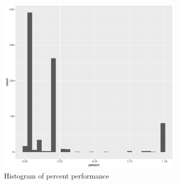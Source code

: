 \documentclass{article}
\begin{document}
\begin{figure}[htbp]
\caption{Histogram of percent performance}
\centering
\includegraphics[width = 0.8\textwidth]{sur_tree}
\end{figure}
\end{document}
